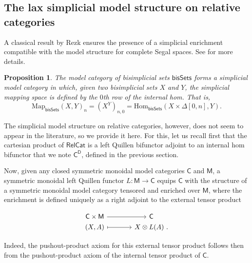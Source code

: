 \documentclass{proc-l}
\theoremstyle{plain}
\newtheorem{proposition}[{theorem}]{Proposition}
\theoremstyle{definition}
\theoremstyle{remark}
\begin{document}
\subsection{The lax simplicial model structure on relative categories}%
\label{Section:A.3}
A classical result by Rezk ensures the presence of a simplicial enrichment compatible with the model structure for complete Segal spaces. See \cite{Rezk01} for more details.

\begin{proposition}%
\label{Proposition:A.7}The model category of bisimplicial sets $\mathsf{bisSets}$ forms a simplicial model category in which, given two bisimplicial sets $X$ and $Y$, the simplicial mapping space is defined by the $0$th row of the internal hom. That is,
\[
\mathrm{Map}_{\mathsf{bisSets}}(X,Y)_n = (X^Y)_{n,0} = \mathrm{Hom}_{\mathsf{bisSets}}(X\times\Delta[0,n],Y).
\]
\end{proposition}

The simplicial model structure on relative categories, however, does not seem to appear in the literature, so we provide it here. For this, let us recall first that the cartesian product of  $\mathsf{RelCat}$ is a left Quillen bifunctor adjoint to an internal hom bifunctor that we note $\mathsf{C}^{\mathsf{D}}$, defined in the previous section.

Now, given any closed symmetric monoidal model categories $\mathsf{C}$ and $\mathsf{M}$, a symmetric monoidal left Quillen functor $L:\mathsf{M}\rightarrow\mathsf{C}$ equips $\mathsf{C}$ with the structure of a symmetric monoidal model category tensored and enriched over $\mathsf{M}$, where the enrichment is defined uniquely as a right adjoint to the external tensor product

\[
\begin{tikzcd}[column sep=3pc,row sep=0pc]
\mathsf{C}\times\mathsf{M} \arrow[r]
&\mathsf{C} \\
(X,A) \arrow[r,mapsto]
&X \otimes L(A)~.
\end{tikzcd}
\]

Indeed, the pushout-product axiom for this external tensor product follows then from the pushout-product axiom of the internal tensor product of $\mathsf{C}$.
\end{document}
